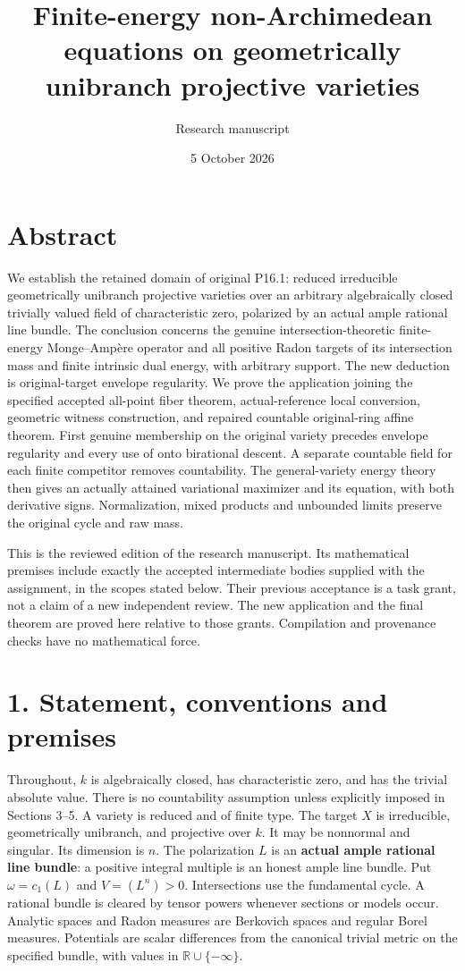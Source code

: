 \documentclass[
  10pt,
]{article}
\title{Finite-energy non-Archimedean equations on geometrically
unibranch projective varieties}
\author{Research manuscript}
\date{5 October 2026}
\begin{document}
\maketitle

\section{Abstract}\label{abstract}

We establish the retained domain of original P16.1: reduced irreducible
geometrically unibranch projective varieties over an arbitrary
algebraically closed trivially valued field of characteristic zero,
polarized by an actual ample rational line bundle. The conclusion
concerns the genuine intersection-theoretic finite-energy Monge--Ampère
operator and all positive Radon targets of its intersection mass and
finite intrinsic dual energy, with arbitrary support. The new deduction
is original-target envelope regularity. We prove the application joining
the specified accepted all-point fiber theorem, actual-reference local
conversion, geometric witness construction, and repaired countable
original-ring affine theorem. First genuine membership on the original
variety precedes envelope regularity and every use of onto birational
descent. A separate countable field for each finite competitor removes
countability. The general-variety energy theory then gives an actually
attained variational maximizer and its equation, with both derivative
signs. Normalization, mixed products and unbounded limits preserve the
original cycle and raw mass.

This is the reviewed edition of the research manuscript. Its mathematical premises include
exactly the accepted intermediate bodies supplied with the assignment,
in the scopes stated below. Their previous acceptance is a task grant,
not a claim of a new independent review. The new application and the
final theorem are proved here relative to those grants. Compilation and
provenance checks have no mathematical force.

\section{1. Statement, conventions and
premises}\label{statement-conventions-and-premises}

Throughout, \(k\) is algebraically closed, has characteristic zero, and
has the trivial absolute value. There is no countability assumption
unless explicitly imposed in Sections 3--5. A variety is reduced and of
finite type. The target \(X\) is irreducible, geometrically unibranch,
and projective over \(k\). It may be nonnormal and singular. Its
dimension is \(n\). The polarization \(L\) is an \textbf{actual ample
rational line bundle}: a positive integral multiple is an honest ample
line bundle. Put \(\omega=c_1(L)\) and \(V=(L^n)>0\). Intersections use
the fundamental cycle. A rational bundle is cleared by tensor powers
whenever sections or models occur. Analytic spaces and Radon measures
are Berkovich spaces and regular Borel measures. Potentials are scalar
differences from the canonical trivial metric on the specified bundle,
with values in \(\mathbb R\cup\{-\infty\}\).
\end{document}
